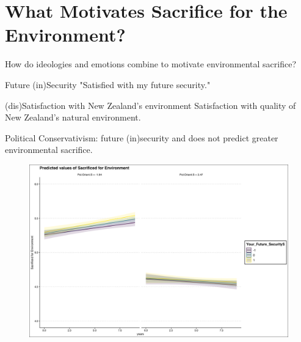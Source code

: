 \documentclass{beamer}
\begin{document}
\section{What Motivates Sacrifice for the Environment?}
\begin{frame}{How do ideologies and emotions combine to motivate environmental sacrifice?}
    

\begin{alertblock}{Future (in)Security}
"Satisfied with my future security."
\end{alertblock}


\begin{alertblock}{(dis)Satisfaction with New Zealand's environment}
Satisfaction with quality of New Zealand's natural environment.
\end{alertblock}


\end{frame}


\begin{frame}{Political Conservativism: future (in)security and does not predict greater environmental sacrifice.}
\begin{figure}
\includegraphics[width=.8\textwidth,height=\textheight,keepaspectratio]{Figures/X_SACRIFICEMADE_Your_Future_SecurityS_Pol.Orient.S.png}
\end{figure}
\end{frame}
\end{document}
